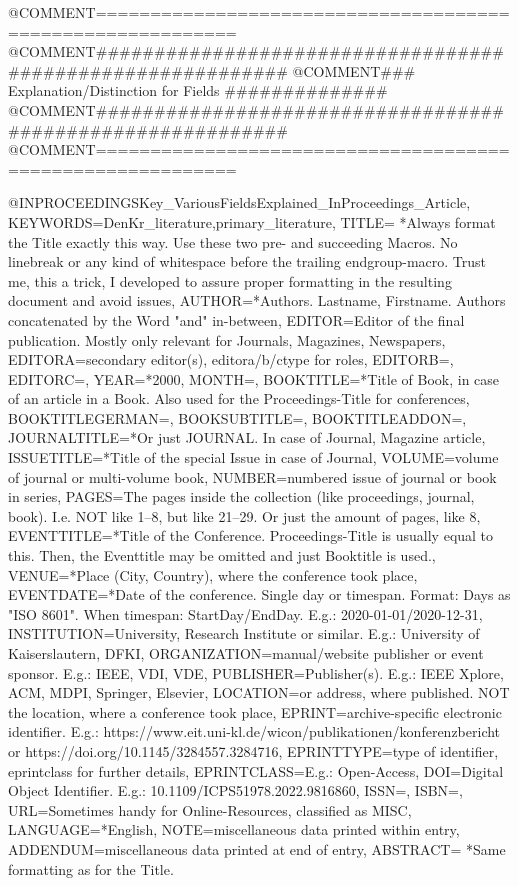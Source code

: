 @COMMENT{===========================================================}
@COMMENT{###########################################################}
@COMMENT{###    Explanation/Distinction for Fields    ##############}
@COMMENT{###########################################################}
@COMMENT{===========================================================}


@INPROCEEDINGS{Key_VariousFieldsExplained_InProceedings_Article,
    KEYWORDS={DenKr_literature,primary_literature},
    TITLE={\begingroup
        *Always format the Title exactly this way. Use these two pre- and succeeding Macros. No linebreak or any kind of whitespace before the trailing endgroup-macro. Trust me, this a trick, I developed to assure proper formatting in the resulting document and avoid issues\endgroup},
    AUTHOR={*Authors. Lastname, Firstname. Authors concatenated by the Word "and" in-between},
    EDITOR={Editor of the final publication. Mostly only relevant for Journals, Magazines, Newspapers},
    EDITORA={secondary editor(s), editora/b/ctype for roles},
    EDITORB={},
    EDITORC={},
    YEAR={*2000},
    MONTH={},
    BOOKTITLE={*Title of Book, in case of an article in a Book. Also used for the Proceedings-Title for conferences},
    BOOKTITLEGERMAN={},
    BOOKSUBTITLE={},
    BOOKTITLEADDON={},
    JOURNALTITLE={*Or just JOURNAL. In case of Journal, Magazine article},
    ISSUETITLE={*Title of the special Issue in case of Journal},
    VOLUME={volume of journal or multi-volume book},
    NUMBER={numbered issue of journal or book in series},
    PAGES={The pages inside the collection (like proceedings, journal, book). I.e. NOT like 1--8, but like 21--29. Or just the amount of pages, like 8},
    EVENTTITLE={*Title of the Conference. Proceedings-Title is usually equal to this. Then, the Eventtitle may be omitted and just Booktitle is used.},
    VENUE={*Place (City, Country), where the conference took place},
    EVENTDATE={*Date of the conference. Single day or timespan. Format: Days as "ISO 8601". When timespan: StartDay/EndDay. E.g.: 2020-01-01/2020-12-31},
    INSTITUTION={University, Research Institute or similar. E.g.: University of Kaiserslautern, DFKI},
    ORGANIZATION={manual/website publisher or event sponsor. E.g.: IEEE, VDI, VDE},
    PUBLISHER={Publisher(s). E.g.: IEEE Xplore, ACM, MDPI, Springer, Elsevier},
    LOCATION={or address, where published. NOT the location, where a conference took place},
    EPRINT={archive-specific electronic identifier. E.g.: https://www.eit.uni-kl.de/wicon/publikationen/konferenzbericht   or   https://doi.org/10.1145/3284557.3284716},
    EPRINTTYPE={type of identifier, eprintclass for further details},
    EPRINTCLASS={E.g.: Open-Access},
    DOI={Digital Object Identifier. E.g.: 10.1109/ICPS51978.2022.9816860},
    ISSN={},
    ISBN={},
    URL={Sometimes handy for Online-Resources, classified as MISC},
    LANGUAGE={*English},
    NOTE={miscellaneous data printed within entry},
    ADDENDUM={miscellaneous data printed at end of entry},
    ABSTRACT={\begingroup
        *Same formatting as for the Title.\endgroup}
}












